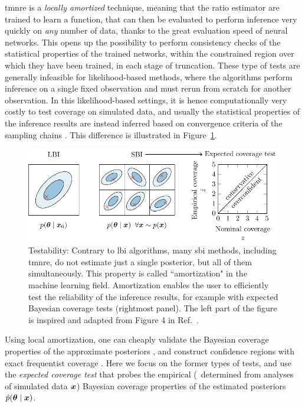 \gls*{tmnre} is a \emph{locally amortized} technique, meaning that the ratio estimator are trained to learn a function, that can then be evaluated to perform inference very quickly on \emph{any} number of data, thanks to the great evaluation speed of neural networks. This opens up the possibility to perform consistency checks of the statistical properties of the trained networks, within the constrained region over which they have been trained, in each stage of truncation. These type of tests are generally infeasible for likelihood-based methods, where the algorithms perform inference on a single fixed observation and must rerun from scratch for another observation. In this likelihood-based settings, it is hence computationally very costly to test coverage on simulated data, and usually the statistical properties of the inference results are instead inferred based on convergence criteria of the sampling chains \cite[\eg][]{vivekan2019convergence}. This difference is illustrated in Figure~\ref{fig:sbi-test}.


\begin{figure}
	\centering
	\includegraphics[width=\linewidth]{TikZ/sbi_test.pdf}
	\caption{Testability: Contrary to \gls*{lbi} algorithms, many \gls*{sbi} methods, including \gls*{tmnre}, do not estimate just a single posterior, but all of them simultaneously. This property is called ``amortization" in the machine learning field. Amortization enables the user to efficiently test the reliability of the inference results, for example with expected Bayesian coverage tests ({rightmost panel}). The left part of the figure is inspired and adapted from Figure 4 in Ref.~\cite{Cole:2021gwr}.
}
\label{fig:sbi-test}
\end{figure}


Using local amortization, one can cheaply validate the Bayesian coverage properties of the approximate posteriors \cite{Hermans:2021rqv, Cole:2021gwr, Karchev:2022xyn}, and construct confidence regions with exact frequentist coverage \cite{Karchev:2022xyn, dalmasso2020confidence, dalmasso2021likelihood}. Here we focus on the former types of tests, and use the \emph{expected coverage test} that probes the empirical (\ie~determined from analyses of simulated data $\bm{x}$) Bayesian coverage properties of the estimated posteriors $\hat{p}(\bm{\theta} \mid \bm{x})$.

